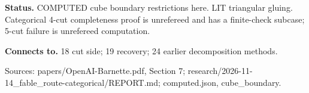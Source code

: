\documentclass[10pt,a4paper]{amsart}
\begin{document}
\textbf{Status.} COMPUTED cube boundary restrictions here. LIT triangular gluing. Categorical 4-cut completeness proof is unrefereed and has a finite-check subcase; 5-cut failure is unrefereed computation.

\textbf{Connects to.} 18 cut side; 19 recovery; 24 earlier decomposition methods.

{\footnotesize\raggedright Sources: papers/\allowbreak{}OpenAI-Barnette.pdf, Section 7;\allowbreak{} research/\allowbreak{}2026-11-14\_fable\_route-categorical/\allowbreak{}REPORT.md;\allowbreak{} computed.json, cube\_boundary.\par}
\end{document}
